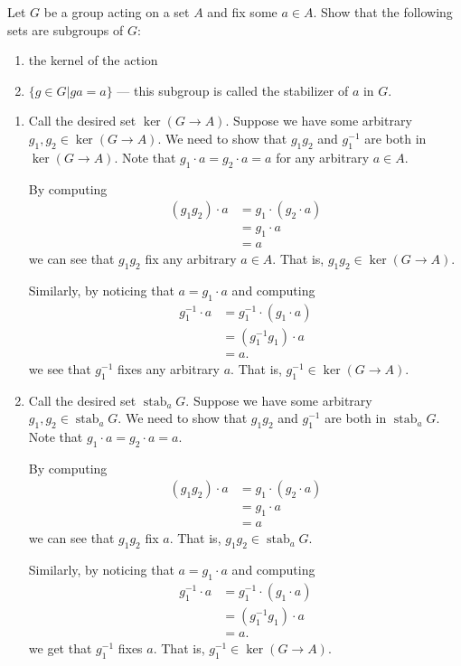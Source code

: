 \documentclass[12 pt, letterpaper]{hmcpset}
\begin{document}
\begin{problem}
	Let $G$ be a group acting on a set $A$ and fix some $a \in A$. Show that the following sets are subgroups of $G$:
	\begin{enumerate}
		\item the kernel of the action
		\item $\{ g \in G | ga = a \}$ --- this subgroup is called the stabilizer of $a$ in $G$.
	\end{enumerate}
\end{problem}

\begin{solution}
	\begin{enumerate}
		\item
			Call the desired set $\ker(G \to A)$. Suppose we have some arbitrary $g_1, g_2 \in \ker(G \to A)$. We need to show that $g_1 g_2$ and $g_1^{-1}$ are both in $\ker(G \to A)$. Note that $g_1 \cdot a = g_2 \cdot a = a$ for any arbitrary $a \in A$. 

			By computing
			\[
				\begin{split}
					(g_1 g_2) \cdot a & = g_1 \cdot (g_2 \cdot a) \\
							  & = g_1 \cdot a \\
							  & = a
				\end{split}
			\]
			we can see that $g_1 g_2$ fix any arbitrary $a \in A$. That is, $g_1 g_2 \in \ker(G \to A)$. 

			Similarly, by noticing that $a = g_1 \cdot a$ and computing
			\[
				\begin{split}
					g_1^{-1} \cdot a & = g_1^{-1} \cdot (g_1 \cdot a) \\
							 & = (g_1^{-1} g_1) \cdot a \\
							 & = a.
				\end{split}
			\]
			we see that $g_1^{-1}$ fixes any arbitrary $a$. That is, $g_1^{-1} \in \ker(G \to A)$.
		\item
			Call the desired set $\operatorname{stab}_a G$. Suppose we have some arbitrary $g_1, g_2 \in \operatorname{stab}_a G$. We need to show that $g_1 g_2$ and $g_1^{-1}$ are both in $\operatorname{stab}_a G$. Note that $g_1 \cdot a = g_2 \cdot a = a$. 

			By computing
			\[
				\begin{split}
					(g_1 g_2) \cdot a & = g_1 \cdot (g_2 \cdot a) \\
							  & = g_1 \cdot a \\
							  & = a
				\end{split}
			\]
			we can see that $g_1 g_2$ fix $a$. That is, $g_1 g_2 \in \operatorname{stab}_a G$. 

			Similarly, by noticing that $a = g_1 \cdot a$ and computing
			\[
				\begin{split}
					g_1^{-1} \cdot a & = g_1^{-1} \cdot (g_1 \cdot a) \\
							 & = (g_1^{-1} g_1) \cdot a \\
							 & = a.
				\end{split}
			\]
			we get that $g_1^{-1}$ fixes $a$. That is, $g_1^{-1} \in \ker(G \to A)$.
	\end{enumerate}
\end{solution}
\end{document}
